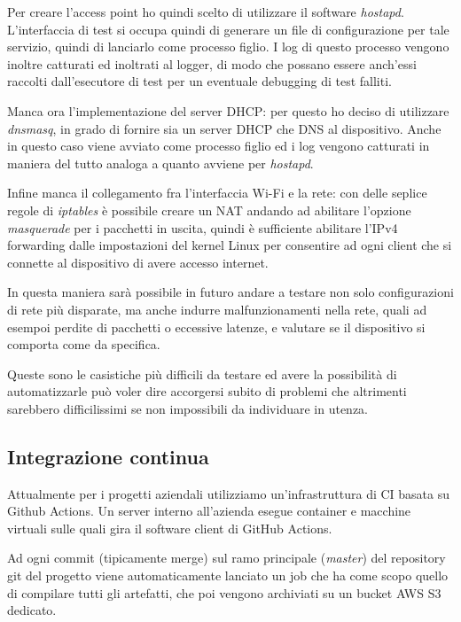 \documentclass[a4paper,titlepage]{article}
\begin{document}
Per creare l'access point ho quindi scelto di utilizzare il software \textit{hostapd}.
L'interfaccia di test si occupa quindi di generare un file di configurazione per tale
servizio, quindi di lanciarlo come processo figlio. I log di questo processo vengono
inoltre catturati ed inoltrati al logger, di modo che possano essere anch'essi raccolti
dall'esecutore di test per un eventuale debugging di test falliti.

Manca ora l'implementazione del server DHCP: per questo ho deciso di utilizzare
\textit{dnsmasq}, in grado di fornire sia un server DHCP che DNS al dispositivo.
Anche in questo caso viene avviato come processo figlio ed i log vengono catturati
in maniera del tutto analoga a quanto avviene per \textit{hostapd}.

Infine manca il collegamento fra l'interfaccia Wi-Fi e la rete: con delle seplice
regole di \textit{iptables} è possibile creare un NAT andando ad abilitare l'opzione
\textit{masquerade} per i pacchetti in uscita, quindi è sufficiente abilitare l'IPv4
forwarding dalle impostazioni del kernel Linux per consentire ad ogni client che si
connette al dispositivo di avere accesso internet.

In questa maniera sarà possibile in futuro andare a testare non solo configurazioni
di rete più disparate, ma anche indurre malfunzionamenti nella rete, quali  ad esempoi
perdite di pacchetti o eccessive latenze, e valutare se il dispositivo si comporta come
da specifica.

Queste sono le casistiche più difficili da testare ed avere la possibilità di automatizzarle
può voler dire accorgersi subito di problemi che altrimenti sarebbero difficilissimi
se non impossibili da individuare in utenza.


\subsection{Integrazione continua}

Attualmente per i progetti aziendali utilizziamo un'infrastruttura di CI basata
su Github Actions. Un server interno all'azienda esegue container e macchine virtuali
sulle quali gira il software client di GitHub Actions.

Ad ogni commit (tipicamente merge) sul ramo principale (\textit{master}) del repository
git del progetto viene automaticamente lanciato un job che ha come scopo quello
di compilare tutti gli artefatti, che poi vengono archiviati su un bucket AWS S3
dedicato.
\end{document}
